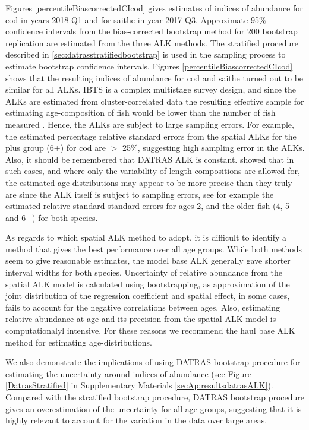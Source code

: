 \documentclass[a4paper 12pt]{article}
\numberwithin{equation}{section}
\begin{document}
\clearpage
Figures \ref{percentileBiascorrectedCIcod} gives estimates of indices of abundance for cod in years 2018 Q1 and for saithe in year 2017 Q3. Approximate 95\% confidence intervals from the bias-corrected bootstrap method for 200 bootstrap replication are estimated from the three ALK methods. The stratified procedure described in \ref{sec:datrasstratifiedbootstrap} is used in the sampling process to estimate bootstrap confidence intervals.   Figures \ref{percentileBiascorrectedCIcod}  shows that the resulting indices of abundance for cod and saithe turned out to be similar for all ALKs. IBTS is a complex multistage survey design, and since the ALKs are estimated from cluster-correlated data the resulting effective sample for estimating age-composition of fish would be lower than the number of fish measured \citep{ICES2013PICS3}. Hence, the ALKs are subject to large sampling errors. For example, the estimated percentage relative standard errors from the spatial ALKs for the plus group (6+) for cod are $>$ 25\%, suggesting high sampling error in the ALKs. Also, it should be remembered that DATRAS ALK is constant.   \citet{aanes2015efficient} showed that in such cases, and where only the variability of  length compositions are allowed for, the estimated age-distributions may appear to be more precise than they truly are since the ALK itself is subject to sampling errors, see for example the estimated relative standard standard errors for ages 2, and the older fish (4, 5 and 6+) for both species. 

As regards to which spatial ALK method to adopt, it is difficult to identify a method that gives the best performance over all age groups. While both methods seem to give reasonable estimates, the model base ALK generally gave shorter interval widths for both species. Uncertainty of relative abundance from the spatial ALK model is calculated using bootstrapping, as approximation of the joint distribution of the regression coefficient and spatial effect, in some cases, fails to account for the  negative correlations between ages. Also, estimating relative abundance at age and its precision from the spatial ALK model is computationalyl intensive. For these reasons we recommend the haul base ALK method for estimating age-distributions.

We also demonstrate the implications of using DATRAS bootstrap procedure for estimating the uncertainty around indices of abundance (see Figure \ref{DatrasStratified} in Supplementary Materials \ref{secAp:resultsdatrasALK}). Compared with the stratified bootstrap procedure, DATRAS bootstrap procedure gives an overestimation of the uncertainty for all age groups, suggesting that it is highly relevant to account for the variation in the data over large areas. 
\end{document}
